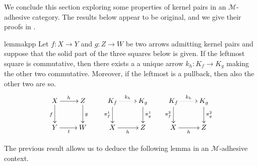 \documentclass[a4paper,UKenglish,cleveref,pdftex,thm-restate,numberwithinsect]{lipics-v2021}
\def\D{\textbf {\textup{D}}}
\def\X{\textbf {\textup{X}}}
\newcommand{\commentato}[1]{ {} }
\begin{document}
\commentato{ 
\begin{restatable}{corollary}{natepi}\label{cor:reg_epi_components_reg_epi_nat_trans}
    Let $\X$ be a category with pullbacks and $\phi\colon F \to G$ a natural transformation between functors $F, G: \D \rightrightarrows \X$. If $\phi_d$ is a regular epi for every $d$, then $\phi$ is a regular epi.
\end{restatable}

From the previous result we deduce that the class of regular epis is closed under colimits.

\begin{restatable}{lemma}{epicol}\label{lemma:nat_trans_reg_epi_canonical_arrow_reg_epi}
    Let $F,G\colon \D\rightrightarrows \X$ be two diagrams, and suppose that $\X$ has all colimits of shape $\D$. Let $(X, \{x_d\}_{d \in \D})$ and $(Y, \{y_d\}_{d\in D})$ be the colimits of $F$ and $G$, respectively.  If $\phi\colon  F \to G$ is a natural transformation whose components are regular epis, then the arrow induced by $\phi$ from $X$ to $Y$ is a regular epi.
\end{restatable}
}
We conclude this section exploring some properties of kernel pairs in an $\mathcal{M}$-adhesive category. 
The results below appear to be original, and we give their proofs in .

\begin{restatable}{lemma}{kpp}\label{lemma:kern_pairs_pres_pullbacks}
	Let $f\colon X \to Y$ and $g\colon Z \to W$ be two arrows admitting kernel pairs and suppose that the solid part of the three squares below is given. 
	If the leftmost square is commutative, then there exists a a unique arrow $k_h: K_f \to K_g$ making the other two commutative.
	Moreover, if the leftmost is a pullback, then also the other two are so.
%
	\[\xymatrix{X \ar[r]^{h}\ar[d]_{f}& Z \ar[d]^{g} & K_f \ar@{.>}[r]^{k_h} \ar[d]_{\pi^1_f}& K_g \ar[d]^{\pi^1_g} & K_f  \ar@{.>}[r]^{k_h} \ar[d]_{\pi^2_f}& K_g \ar[d]^{\pi^2_g}\\ Y \ar[r]_t& W & X \ar[r]_{h} & Z & X\ar[r]_{h} &Z}\]
	
\end{restatable}

The previous result allows us to deduce the following lemma in an $\mathcal{M}$-adhesive context.
\end{document}
